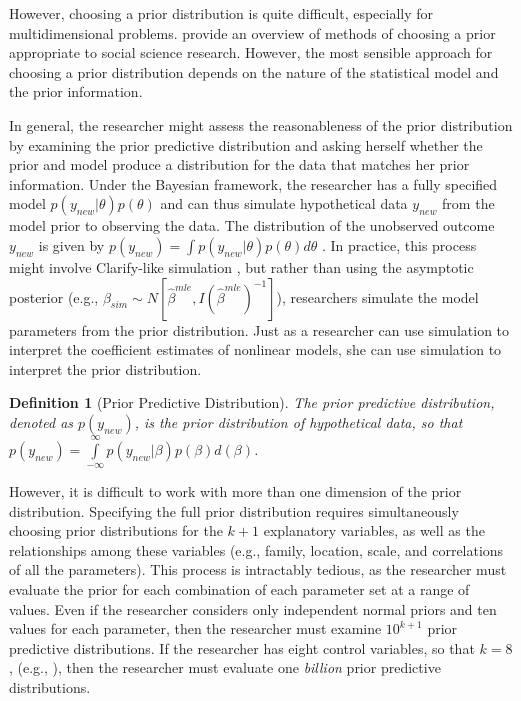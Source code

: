 \documentclass[12pt]{article}
\newtheorem{defn}{Definition}
\begin{document}
However, choosing a prior distribution is quite difficult, especially for multidimensional problems. 
\cite{GillWalker2005} provide an overview of methods of choosing a prior appropriate to social science research. 
However, the most sensible approach for choosing a prior distribution depends on the nature of the statistical model and the prior information.

In general, the researcher might assess the reasonableness of the prior distribution by examining the prior predictive distribution and asking herself whether the prior and model produce a distribution for the data that matches her prior information. 
Under the Bayesian framework, the researcher has a fully specified model $p(y_{new}|\theta)p(\theta)$ and can thus simulate hypothetical data $y_{new}$ from the model prior to observing the data. 
The distribution of the unobserved outcome $y_{new}$ is given by $p(y_{new}) = \int p(y_{new} | \theta)p(\theta) d\theta$ \citep{Box1980}. 
In practice, this process might involve Clarify-like simulation \citep{KingTomzWittenberg2000}, but rather than using the asymptotic posterior (e.g., $\beta_{sim} \sim N\left[\hat{\beta}^{mle}, I(\hat{\beta}^{mle})^{-1}\right]$), researchers simulate the model parameters from the prior distribution. 
Just as a researcher can use simulation to interpret the coefficient estimates of nonlinear models, she can use simulation to interpret the prior distribution.

\begin{defn}[Prior Predictive Distribution] The prior predictive distribution, denoted as $p(y_{new})$, is the prior distribution of hypothetical data, so that $p(y_{new}) = \int\limits_{-\infty}^{\infty} p(y_{new} | \beta)p(\beta)d(\beta)$.
\end{defn}

However, it is difficult to work with more than one dimension of the prior distribution. 
Specifying the full prior distribution requires simultaneously choosing prior distributions for the $k + 1$ explanatory variables, as well as the relationships among these variables (e.g., family, location, scale, and correlations of all the parameters). 
This process is intractably tedious, as the researcher must evaluate the prior for each combination of each parameter set at a range of values. 
Even if the researcher considers only independent normal priors and ten values for each parameter, then the researcher must examine $10^{k+1}$ prior predictive distributions. 
If the researcher has eight control variables, so that $k = 8$, (e.g., \citealt{BarrilleauxRainey2014}), then the researcher must evaluate one \emph{billion} prior predictive distributions.
\end{document}
